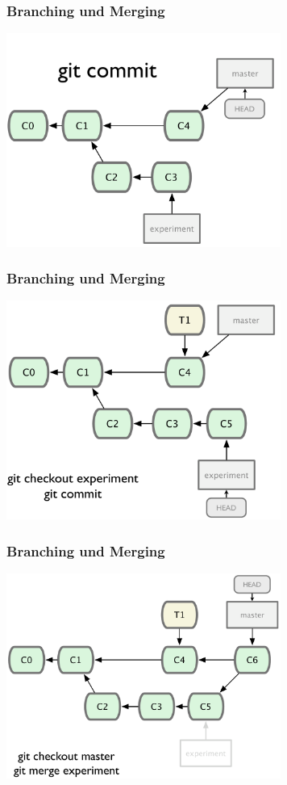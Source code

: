 \begin{frame}
  \frametitle{Branching und Merging}
  \begin{center}
    \includegraphics[width=9cm]{img/branch_5.pdf}
  \end{center}
\end{frame}

\begin{frame}
  \frametitle{Branching und Merging}
  \begin{center}
    \includegraphics[width=9cm]{img/branch_6.pdf}
  \end{center}
\end{frame}

\begin{frame}
  \frametitle{Branching und Merging}
  \begin{center}
    \includegraphics[width=9cm]{img/branch_7.pdf}
  \end{center}
\end{frame}

